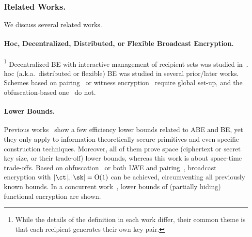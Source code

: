 \subsubsection{Related Works.}
We discuss several related works.

\paragraph{\Ad Hoc, Decentralized, Distributed, or Flexible
Broadcast Encryption.}
\leavevmode\unskip\footnote{
While the details of the definition in each work differ,
their common theme is that each recipient generates their own key pair.}
Decentralized BE
with interactive management of recipient sets
was studied in~\cite{SCN:PhaPoiStr12,PAIRING:DelPaiPoi07}.
\Ad hoc (a.k.a.~distributed or flexible) BE
was studied in several prior/later works.
Schemes based on
pairing~\cite{DHMR08,CCS:WQZD10,KolMalWee23} or
witness encryption~\cite{C:FreWatWu23}
require global set-up, and
the obfuscation-based one~\cite{C:BonZha14} do not.

\paragraph{Lower Bounds.}
Previous works~\cite{EC:BluCre94,EC:LubSta98,AC:KYDB98,AFRICACRYPT:AusKre08,AC:KatYer09,C:GayKerWee15,ITC:DLY21} show a few efficiency lower bounds related to ABE and BE,
yet they only apply to information-theoretically secure primitives and even specific construction techniques.
Moreover, all of them prove space (ciphertext or secret key size, or their trade-off) lower bounds, whereas
this work is about space-time trade-offs.
Based on obfuscation~\cite{C:BonWatZha14} or both LWE and pairing~\cite{EC:AgrYam20}, broadcast encryption with ${|\ct|,|\sk|=\bigO(1)}$ can be achieved,
circumventing all previously known bounds.
In a concurrent work~\cite{EC:JaiLinLuo23},
lower bounds of (partially hiding) functional encryption are shown.
